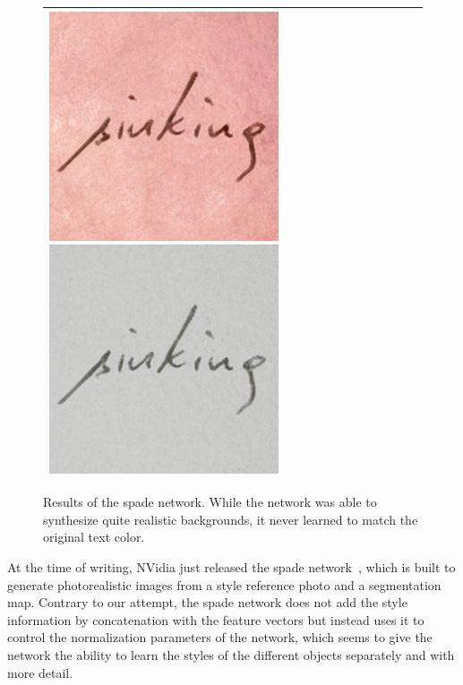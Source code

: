 \begin{figure}
\begin{tabular}{lc}
{  \includegraphics[scale=0.18]{../assets/background_style_transfer/spade/result/74.png}%
  \includegraphics[scale=0.18]{../assets/background_style_transfer/spade/result/99.png}%
  }
  \\
  \bottomrule
  \end{tabular}
  \caption[Results of the \gls{spade} network]{Results of the \gls{spade} network. While the network was able to synthesize quite realistic backgrounds, it never learned to match the original text color.}
  \label{fig:spadeResults}
\end{figure}


At the time of writing, NVidia just released the \gls{spade} network~\cite{spade}, which is built to generate photorealistic images from a style reference photo and a segmentation map. Contrary to our attempt, the \gls{spade} network does not add the style information by concatenation with the feature vectors but instead uses it to control the normalization parameters of the network, which seems to give the network the ability to learn the styles of the different objects separately and with more detail.

